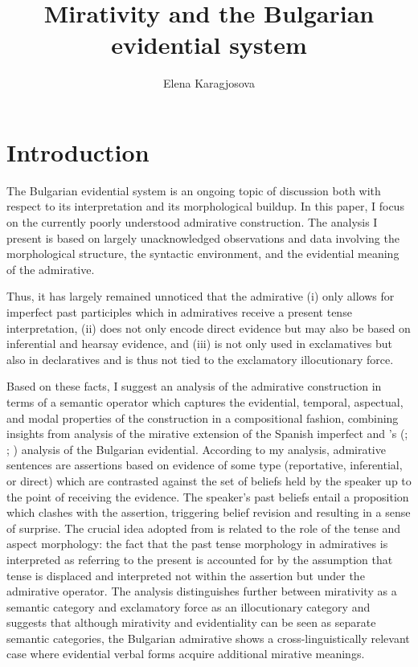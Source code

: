 \documentclass[output=paper,
colorlinks,
citecolor=brown,
newtxmath
]{langscibook}
\author{Elena Karagjosova\affiliation{Freie Universität Berlin}}
\title{Mirativity and the Bulgarian evidential system}
\begin{document}
\maketitle

\section{Introduction}\label{sec:intro}

The Bulgarian evidential system is an ongoing topic of discussion both with respect to its interpretation and its morphological buildup. In this paper, I focus on the currently poorly understood admirative construction. The analysis I present is based on largely unacknowledged observations and data involving the morphological structure, the syntactic environment, and the evidential meaning of the admirative.

Thus, it has largely remained unnoticed that the admirative (i) only allows for imperfect past participles which in admiratives receive a present tense interpretation, (ii) does not only encode direct evidence but may also be based on inferential and hearsay evidence, and (iii) is not only used in exclamatives but also in declaratives and is thus not tied to the exclamatory illocutionary force.

Based on these facts, I suggest an analysis of the admirative construction in terms of a semantic operator which captures the evidential, temporal, aspectual, and modal properties of the construction in a compositional fashion, combining insights from  analysis of the mirative extension of the Spanish imperfect and \citeauthor{Smirnova2011a}'s (\citeyear{Smirnova2011a}; \citeyear{Smirnova2011b}; \citeyear{Smirnova2013}) analysis of the Bulgarian evidential. According to my analysis, admirative sentences are assertions based on evidence of some type (reportative, inferential, or direct) which are contrasted against the set of beliefs held by the speaker up to the point of receiving the evidence. The speaker's past beliefs entail a proposition which clashes with the assertion, triggering belief revision and resulting in a sense of surprise.
The crucial idea adopted from \citeauthor{Bustamante2013} is related to the role of the tense and aspect morphology: the fact that the past tense morphology in admiratives is interpreted as referring to the present is accounted for by the assumption that tense is displaced and interpreted not within the assertion but under the admirative operator.
The analysis distinguishes further between mirativity as a semantic category and exclamatory force as an illocutionary category and suggests that although mirativity and evidentiality can be seen as separate semantic categories, the Bulgarian admirative shows a cross-linguistically relevant case where evidential verbal forms acquire additional mirative meanings.
\end{document}
